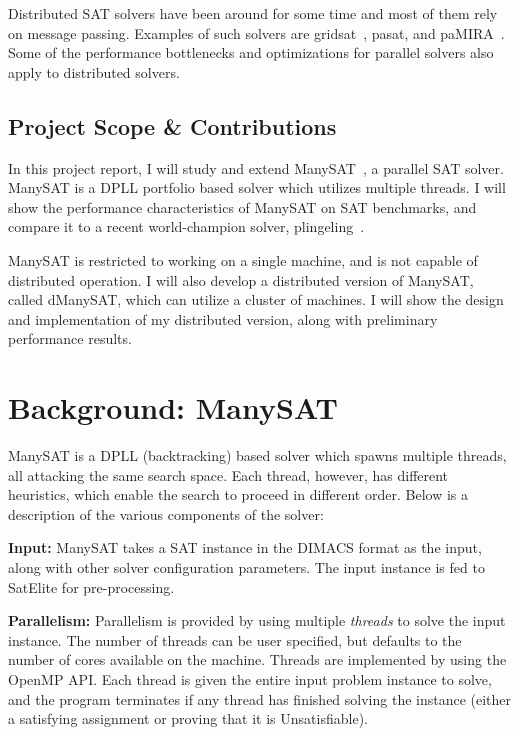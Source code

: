 \documentclass{article}
\begin{document}
Distributed SAT solvers have been around for some time and most of
them rely on message passing. Examples of such solvers are
gridsat~\cite{chrabakh2003gridsat}, pasat, and
paMIRA~\cite{schubert2005pamira}. Some of the performance bottlenecks
and optimizations for parallel solvers also apply to distributed
solvers.


\subsection{Project Scope \& Contributions}

In this project report, I will study and extend
ManySAT~\cite{manysat}, a parallel SAT solver. ManySAT is a
DPLL portfolio based solver which utilizes multiple threads. I will
show the performance characteristics of ManySAT on SAT benchmarks, and
compare it to a recent world-champion solver,
plingeling~\cite{plingeling}.


ManySAT is restricted to working on a single machine, and is not
capable of distributed operation. I will also develop a distributed
version of ManySAT, called dManySAT, which can utilize a cluster of
machines. I will show the design and implementation of my distributed
version, along with preliminary performance results.


\section{Background: ManySAT}

ManySAT is a DPLL (backtracking) based solver which spawns multiple
threads, all attacking the same search space. Each thread, however,
has different heuristics, which enable the search to proceed in
different order. Below is a description of the various components of the solver:

\textbf{Input: } ManySAT takes a SAT instance in the DIMACS format as
the input, along with other solver configuration parameters. The input
instance is fed to SatElite for pre-processing.


\textbf{Parallelism: } Parallelism is provided by using multiple
\emph{threads} to solve the input instance. The number of threads can
be user specified, but defaults to the number of cores available on
the machine. Threads are implemented by using the OpenMP API. Each
thread is given the entire input problem instance to solve, and the
program terminates if any thread has finished solving the instance
(either a satisfying assignment or proving that it is Unsatisfiable).
\end{document}
